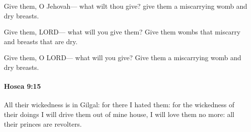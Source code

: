 			\begin{versebox}
					\item[BHS] 
					\item[LXX] 
					\item[ASV] Give them, O Jehovah— what wilt thou give? give them a miscarrying womb and dry breasts.
					\item[NIV] Give them, LORD— what will you give them? Give them wombs that miscarry and breasts that are dry.
					\item[NRSV] Give them, O LORD— what will you give? Give them a miscarrying womb and dry breasts.
			\end{versebox}

		\paragraph{Hosea 9:15} %
			\label{HOSEA-9-15}

			All their wickedness is in Gilgal: for there I hated them: for the wickedness of their doings I will drive them out of mine house, I will love them no more: all their princes are revolters.

